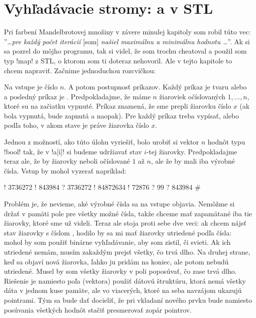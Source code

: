 \chapter{Vyhľadávacie stromy:  a  v STL}
\label{sect:stromy}

Pri farbení Mandelbrotovej množiny v závere minulej kapitoly som robil túto vec:
''{\em \ldots pre každý počet iterácií } [som] {\em našiel maximálnu a minimálnu hodnotu
\ldots}''. Ak si sa pozrel do môjho programu, tak si videl, že som trochu cheatoval
a použil som typ \prg!map! z STL, o ktorom som ti doteraz nehovoril. Ale v tejto
kapitole to chcem napraviť. Začnime jednoduchou rozcvičkou:

\begin{uloha}
  Na vstupe je číslo $n$. A potom postupnosť príkazov. Každý príkaz je tvaru
   alebo  a posledný príkaz je \vb{\#}. 
  Predpokladajme, že máme $n$ žiaroviek očíslovaných $1,\ldots,n$, 
  ktoré su na začiatku vypnuté. Príkaz  znamená, že sme prepli žiarovku
  číslo $x$ (ak bola vypnutá, bude zapnutá a naopak). Pre každý príkaz 
  treba vypísať,  alebo  podľa toho, v akom stave je práve žiarovka
  číslo $x$.
\end{uloha}

Jednou z možností, ako túto úlohu vyriešiť, bolo urobiť si vektor $n$ hodnôt typu \prg!bool!
tak, že v \prg!a[i]! si budeme udržiavať stav $i$-tej
žiarovky. Predpokladajme teraz ale, že by žiarovky neboli očíslované $1$ až $n$, ale
že by mali iba výrobné čísla. Vstup by mohol vyzerať napríklad:\\

\begin{outputBox}
! 3736272
! 843984
? 3736272
! 84872634
! 72876
? 99
? 843984
#
\end{outputBox}

Problém je, že nevieme, aké výrobné čísla sa na vstupe objavia. Nemôžme si držať v pamäti 
pole pre všetky možné čísla, takže chceme mať zapamätané iba tie žiarovky, ktoré sme 
už videli. Teraz ale stoja proti sebe dve veci: ak chcem nájsť stav žiarovky s číslom 
, hodilo by sa mi mať žiarovky utriedené podľa čísla: mohol by som použiť
binárne vyhľadávanie, aby som zistil, či  svieti. Ak ich utriedené nemám,
musím zakaždým prejsť všetky, čo trvá dlho. Na druhej strane, keď sa  objaví nová
žiarovka, ľahko ju pridám na koniec, ale potom nebudú utriedené. Musel by som 
všetky žiarovky v poli poposúvať, čo zase trvá dlho. 
Riešenie je namiesto poľa (vektora) použiť dátovú štruktúru, ktorá nemá všetky dáta
v jednom kuse pamäte, ale vo viacerých, ktoré na seba navzájom ukazujú pointrami. Tým
sa bude dať docieliť, že pri vkladaní nového prvku
bude namiesto posúvania všetkých hodnôt stačiť presmerovať
zopár pointrov. 

